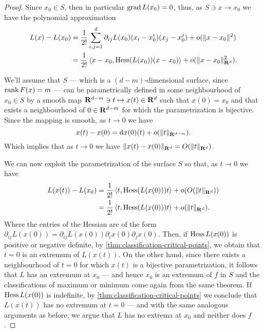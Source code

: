 \begin{proof}
    Since \(x_0 \in S\), then in particular \(\operatorname{grad} L(x_0) = 0\), thus, as \(S \ni x \to
    x_0\) we have the polynomial approximation
    \begin{align*}
        L(x) - L(x_0)
         & = \frac{1}{2!} \sum_{i, j = 1}^{d} \partial_{i j} L(x_0) (x_i - x_0^i) (x_j - x_0^j)
        + o(\lVert x - x_0\rVert^2)                                                                   \\
         & = \frac{1}{2!} \left\langle x - x_{0}, \operatorname{Hess}(L(x_0)) (x - x_0) \right\rangle
        + o(\lVert x - x_0\rVert_{\mathbf{R}^d}^2).
    \end{align*}

    We'll assume that \(S\) --- which is a \((d - m)\)-dimensional surface, since
    \(\operatorname{rank} F(x) = m\) --- can be parametrically defined in some neighbourhood of
    \(x_0 \in S\) by a smooth map \(\mathbf{R}^{d - m} \ni t \mapsto x(t) \in \mathbf{R}^d\) such that \(x(0)
    = x_0\) and that exists a neighbourhood of \(0 \in \mathbf{R}^{d-m}\) for which the
    parametrization is bijective. Since the mapping is smooth, as \(t \to 0\) we
    have
    \[
        x(t) - x(0) = \mathrm{d} x(0)(t) + o(\lVert t\rVert_{\mathbf{R}^{d-m}}).
    \]
    Which implies that as \(t \to 0\) we have \(\lVert x(t) - x(0)\rVert_{\mathbf{R}^d} =
    O(\lVert t\rVert_{\mathbf{R}^{d}})\).

    We can now exploit the parametrization of the surface \(S\) so that, as \(t \to
    0\) we have
    \begin{align*}
        L(x(t)) - L(x_0)
         & = \frac{1}{2!} \left\langle t, \operatorname{Hess}(L(x(0))) t \right\rangle +
        o(O(\lVert t\rVert_{\mathbf{R}^d}))                                              \\
         & = \frac{1}{2!} \left\langle t, \operatorname{Hess}(L(x(0))) t \right\rangle +
        o(\lVert t\rVert_{\mathbf{R}^d}).
    \end{align*}
    Where the entries of the Hessian are of the form
    \(\partial_{ij} L(x(0)) = \partial_{i j} L(x(0)) \partial_i x(0) \partial_j
    x(0)\). Then, if \(\operatorname{Hess} L(x(0))\) is positive or negative definite, by
    \cref{thm:classification-critical-points}, we obtain that \(t = 0\) is an
    extremum of \(L(x(t))\). On the other hand, since there exists a neighbourhood
    of \(t = 0\) for which \(x(t)\) is a bijective parametrization, it follows that
    \(L\) has an extremum at \(x_0\) --- and hence \(x_0\) is an extremum of \(f\)
    in \(S\) and the classifications of maximum or minimum come again from the same
    theorem. If \(\operatorname{Hess} L(x(0))\) is indefinite, by
    \cref{thm:classification-critical-points} we conclude that \(L(x(t))\) has no
    extremum at \(t = 0\) --- and with the same analogous arguments as before, we
    argue that \(L\) has no extrema at \(x_0\) and neither does \(f\).
\end{proof}